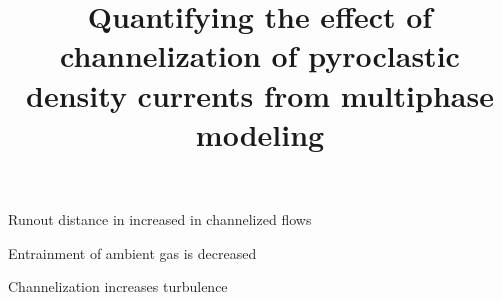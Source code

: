 \usepackage{amsmath,amssymb}
\usepackage{siunitx}
\usepackage{graphicx}



%
%


\title{Quantifying the effect of channelization of pyroclastic density currents from multiphase modeling }


%
%







\begin{keypoints}
\item Runout distance in increased in channelized flows 
\item Entrainment of ambient gas is decreased
\item Channelization increases turbulence
\end{keypoints}

%
%



